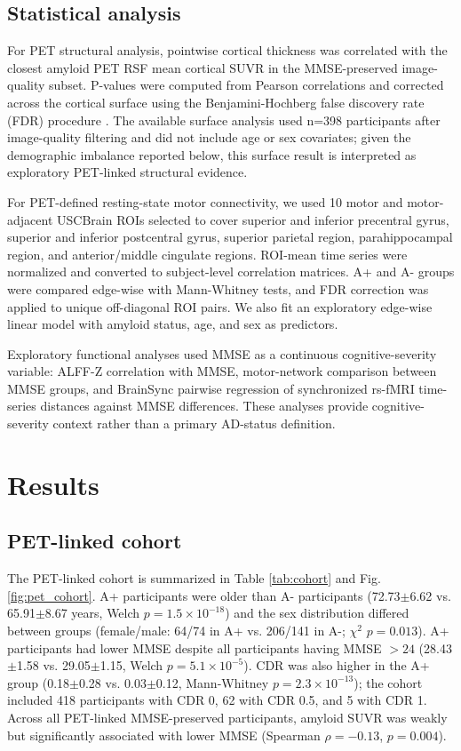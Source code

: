 \documentclass[review,3p,times,12pt,letterpaper]{elsarticle}
\begin{document}
\subsection{Statistical analysis}

For PET structural analysis, pointwise cortical thickness was correlated with the closest amyloid PET RSF mean cortical SUVR in the MMSE-preserved image-quality subset. P-values were computed from Pearson correlations and corrected across the cortical surface using the Benjamini-Hochberg false discovery rate (FDR) procedure \cite{fisher1915frequency,benjamini_1995_controlling_false_discovery}. The available surface analysis used n=398 participants after image-quality filtering and did not include age or sex covariates; given the demographic imbalance reported below, this surface result is interpreted as exploratory PET-linked structural evidence.

For PET-defined resting-state motor connectivity, we used 10 motor and motor-adjacent USCBrain ROIs selected to cover superior and inferior precentral gyrus, superior and inferior postcentral gyrus, superior parietal region, parahippocampal region, and anterior/middle cingulate regions. ROI-mean time series were normalized and converted to subject-level correlation matrices. A+ and A- groups were compared edge-wise with Mann-Whitney tests, and FDR correction was applied to unique off-diagonal ROI pairs. We also fit an exploratory edge-wise linear model with amyloid status, age, and sex as predictors.

Exploratory functional analyses used MMSE as a continuous cognitive-severity variable: ALFF-Z correlation with MMSE, motor-network comparison between MMSE groups, and BrainSync pairwise regression of synchronized rs-fMRI time-series distances against MMSE differences. These analyses provide cognitive-severity context rather than a primary AD-status definition.

\section{Results}

\subsection{PET-linked cohort}

The PET-linked cohort is summarized in Table \ref{tab:cohort} and Fig. \ref{fig:pet_cohort}. A+ participants were older than A- participants (72.73$\pm$6.62 vs. 65.91$\pm$8.67 years, Welch $p=1.5\times10^{-18}$) and the sex distribution differed between groups (female/male: 64/74 in A+ vs. 206/141 in A-; $\chi^2$ $p=0.013$). A+ participants had lower MMSE despite all participants having MMSE $>24$ (28.43$\pm$1.58 vs. 29.05$\pm$1.15, Welch $p=5.1\times10^{-5}$). CDR was also higher in the A+ group (0.18$\pm$0.28 vs. 0.03$\pm$0.12, Mann-Whitney $p=2.3\times10^{-13}$); the cohort included 418 participants with CDR 0, 62 with CDR 0.5, and 5 with CDR 1. Across all PET-linked MMSE-preserved participants, amyloid SUVR was weakly but significantly associated with lower MMSE (Spearman $\rho=-0.13$, $p=0.004$).
\end{document}
